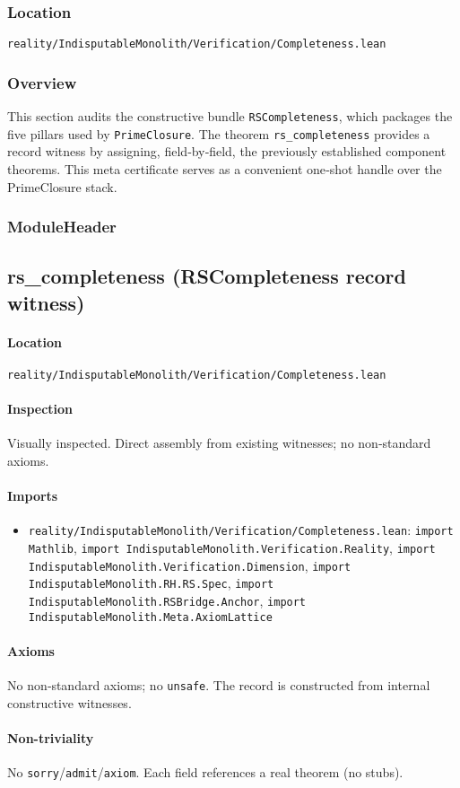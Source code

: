 \documentclass{article}
\newcommand{\FileRef}[1]{\texttt{#1}}
\newcommand{\ModuleHeader}[3]{%
  \subsection{#1}
  \paragraph{Location} \FileRef{#2}\\
  \paragraph{Inspection} #3
}
\begin{document}
\subsubsection{Location}
\FileRef{reality/IndisputableMonolith/Verification/Completeness.lean}

\subsubsection{Overview}
This section audits the constructive bundle \texttt{RSCompleteness}, which packages the five pillars used by \texttt{PrimeClosure}. The theorem \texttt{rs\_completeness} provides a record witness by assigning, field‑by‑field, the previously established component theorems. This meta certificate serves as a convenient one‑shot handle over the PrimeClosure stack.

\subsubsection{ModuleHeader}
\ModuleHeader{rs\_completeness (RSCompleteness record witness)}{reality/IndisputableMonolith/Verification/Completeness.lean}{Visually inspected. Direct assembly from existing witnesses; no non‑standard axioms.}

\paragraph{Imports}
\begin{itemize}[leftmargin=*]
  \item \FileRef{reality/IndisputableMonolith/Verification/Completeness.lean}: \texttt{import Mathlib}, \texttt{import IndisputableMonolith.Verification.Reality}, \texttt{import IndisputableMonolith.Verification.Dimension}, \texttt{import IndisputableMonolith.RH.RS.Spec}, \texttt{import IndisputableMonolith.RSBridge.Anchor}, \texttt{import IndisputableMonolith.Meta.AxiomLattice}
\end{itemize}

\paragraph{Axioms}
No non‑standard axioms; no \texttt{unsafe}. The record is constructed from internal constructive witnesses.

\paragraph{Non-triviality}
No \texttt{sorry}/\texttt{admit}/\texttt{axiom}. Each field references a real theorem (no stubs).
\end{document}
